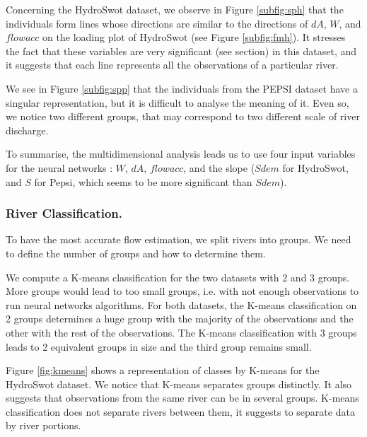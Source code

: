 Concerning the HydroSwot dataset, we observe in Figure \ref{subfig:sph} that the individuals form lines whose directions are similar to the directions of $dA$, $W$, and $flowacc$ on the loading plot of HydroSwot (see Figure \ref{subfig:fmh}). It stresses the fact that these variables are very significant (see  section) in this dataset, and it suggests that each line represents all the observations of a particular river.

We see in Figure \ref{subfig:spp} that the individuals from the PEPSI dataset have a singular representation, but it is difficult to analyse the meaning of it. Even so, we notice two different groups, that may correspond to two different scale of river discharge.\newline

To  summarise, the multidimensional analysis leads us to use four input variables for the neural networks : $W$, $dA$, $flowacc$, and the slope ($Sdem$ for HydroSwot, and $S$ for Pepsi, which seems to be more significant than $Sdem$).

\subsubsection{River Classification.\label{section233}} 

To have the most accurate flow estimation, we split rivers into groups. We need to define the number of groups and how to determine them.

We compute a K-means classification for the two datasets with 2 and 3 groups. More groups would lead to too small groups, i.e. with not enough observations to run neural networks algorithms. For both datasets, the K-means classification on 2 groups determines a huge group with the majority of the observations and the other with the rest of the observations. The K-means classification with 3 groups leads to 2 equivalent groups in size and the third group remains small.  

Figure \ref{fig:kmeans} shows a representation of classes by K-means for the HydroSwot dataset. We notice that K-means separates groups distinctly. It also suggests that observations from the same river can be in several groups. K-means classification does not separate rivers between them, it suggests to separate data by river portions.

